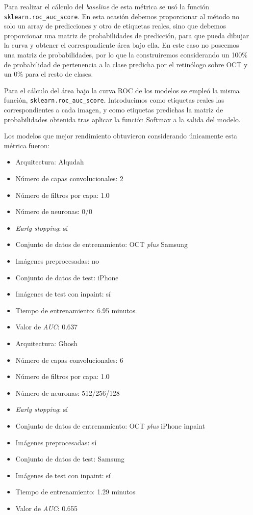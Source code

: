 Para realizar el cálculo del \textit{baseline} de esta métrica se usó la función \texttt{sklearn.roc\_auc\_score}. En esta ocasión debemos proporcionar al método no solo un array de predicciones y otro de etiquetas reales, sino que debemos proporcionar una matriz de probabilidades de predicción, para que pueda dibujar la curva y obtener el correspondiente área bajo ella. En este caso no poseemos una matriz de probabilidades, por lo que la construiremos considerando un 100\% de probabilidad de pertenencia a la clase predicha por el retinólogo sobre OCT y un 0\% para el resto de clases.

Para el cálculo del área bajo la curva ROC de los modelos se empleó la misma función, \texttt{sklearn.roc\_auc\_score}. Introducimos como etiquetas reales las correspondientes a cada imagen, y como etiquetas predichas la matriz de probabilidades obtenida tras aplicar la función Softmax a la salida del modelo.

Los modelos que mejor rendimiento obtuvieron considerando únicamente esta métrica fueron:

\begin{itemize}
    \item Arquitectura: Alqudah
    \item Número de capas convolucionales: 2
    \item Número de filtros por capa: 1.0
    \item Número de neuronas: 0/0
    \item \textit{Early stopping}: sí
    \item Conjunto de datos de entrenamiento: OCT \textit{plus} Samsung
    \item Imágenes preprocesadas: no
    \item Conjunto de datos de test: iPhone
    \item Imágenes de test con inpaint: sí
    \item Tiempo de entrenamiento: 6.95 minutos
    \item Valor de \textit{AUC}: 0.637
\end{itemize}

\begin{itemize}
    \item Arquitectura: Ghosh
    \item Número de capas convolucionales: 6
    \item Número de filtros por capa: 1.0
    \item Número de neuronas: 512/256/128
    \item \textit{Early stopping}: sí
    \item Conjunto de datos de entrenamiento: OCT \textit{plus} iPhone inpaint
    \item Imágenes preprocesadas: sí
    \item Conjunto de datos de test: Samsung
    \item Imágenes de test con inpaint: sí
    \item Tiempo de entrenamiento: 1.29 minutos
    \item Valor de \textit{AUC}: 0.655
\end{itemize}

